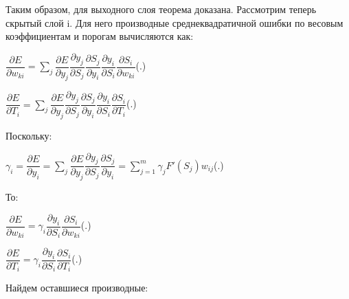 {	\par \redline Таким образом, для выходного слоя теорема доказана. Рассмотрим теперь скрытый слой i. Для него производные среднеквадратичной ошибки по весовым коэффициентам и порогам вычисляются как:
		
	\formulaspace \par \redline 
	$\dfrac{\partial E}{\partial w_{ki}} =  \sum \limits _{j}^{} \dfrac{\partial E}{\partial y_j} \dfrac{\partial y_j}{\partial S_j} \dfrac{\partial S_j}{\partial y_{i}}\dfrac{\partial y_i}{\partial S_i} \dfrac{\partial S_i}{\partial w_{ki}}$\hfill (\thechaptercntr .\theformulacntr) \redline
	\formulaspace \addtocounter{formulacntr}{1}
	
	\formulaspace \par \redline 
	$\dfrac{\partial E}{\partial T_{i}} =  \sum \limits _{j}^{} \dfrac{\partial E}{\partial y_j} \dfrac{\partial y_j}{\partial S_j} \dfrac{\partial S_j}{\partial y_{i}}\dfrac{\partial y_i}{\partial S_i} \dfrac{\partial S_i}{\partial T_{i}}$\hfill (\thechaptercntr .\theformulacntr) \redline
	\formulaspace \addtocounter{formulacntr}{1}
	
	\par \redline Поскольку:
	 
	\formulaspace \par \redline 
	$\gamma_{i} =  \dfrac{\partial E}{\partial y_i} = \sum \limits _{j}^{} \dfrac{\partial E}{\partial y_j} \dfrac{\partial y_j}{\partial S_j} \dfrac{\partial S_j}{\partial y_i} = \sum \limits _{j=1}^{m} \gamma_{j} F'(S_{j}) w_{ij}$\hfill (\thechaptercntr .\theformulacntr) \redline
	\formulaspace \addtocounter{formulacntr}{1}
	
	\par \redline То:
	
		\formulaspace \par \redline 
	$\dfrac{\partial E}{\partial w_{ki}} =  \gamma_{i} \dfrac{\partial y_i}{\partial S_i} \dfrac{\partial S_i}{\partial w_{ki}}$\hfill (\thechaptercntr .\theformulacntr) \redline
	\formulaspace \addtocounter{formulacntr}{1}
	
	\formulaspace \par \redline 
	$\dfrac{\partial E}{\partial T_{i}} =  \gamma_{i}\dfrac{\partial y_i}{\partial S_i} \dfrac{\partial S_i}{\partial T_{i}}$\hfill (\thechaptercntr .\theformulacntr) \redline
	\formulaspace \addtocounter{formulacntr}{1}
	
	\par \redline Найдем оставшиеся производные:
	
}
